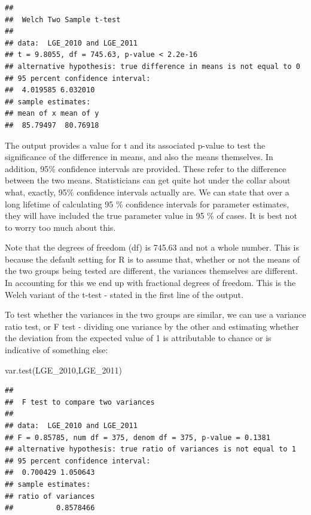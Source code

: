 \documentclass[
]{book}
\newenvironment{Shaded}{\begin{snugshade}}{\end{snugshade}}
\newcommand{\FunctionTok}[1]{\textcolor[rgb]{0.00,0.00,0.00}{#1}}
\newcommand{\NormalTok}[1]{#1}
\begin{document}
\begin{verbatim}
## 
##  Welch Two Sample t-test
## 
## data:  LGE_2010 and LGE_2011
## t = 9.8055, df = 745.63, p-value < 2.2e-16
## alternative hypothesis: true difference in means is not equal to 0
## 95 percent confidence interval:
##  4.019585 6.032010
## sample estimates:
## mean of x mean of y 
##  85.79497  80.76918
\end{verbatim}

The output provides a value for t and its associated p-value to test the significance of the difference in means, and also the means themselves. In addition, 95\% confidence intervals are provided. These refer to the difference between the two means. Statisticians can get quite hot under the collar about what, exactly, 95\% confidence intervals actually are. We can state that over a long lifetime of calculating 95 \% confidence intervals for parameter estimates, they will have included the true parameter value in 95 \% of cases. It is best not to worry too much about this.

Note that the degrees of freedom (df) is 745.63 and not a whole number. This is because the default setting for R is to assume that, whether or not the means of the two groups being tested are different, the variances themselves are different. In accounting for this we end up with fractional degrees of freedom. This is the Welch variant of the t-test - stated in the first line of the output.

To test whether the variances in the two groups are similar, we can use a variance ratio test, or F test - dividing one variance by the other and estimating whether the deviation from the expected value of 1 is attributable to chance or is indicative of something else:

\begin{Shaded}
\begin{Highlighting}[]
\FunctionTok{var.test}\NormalTok{(LGE\_2010,LGE\_2011)}
\end{Highlighting}
\end{Shaded}

\begin{verbatim}
## 
##  F test to compare two variances
## 
## data:  LGE_2010 and LGE_2011
## F = 0.85785, num df = 375, denom df = 375, p-value = 0.1381
## alternative hypothesis: true ratio of variances is not equal to 1
## 95 percent confidence interval:
##  0.700429 1.050643
## sample estimates:
## ratio of variances 
##          0.8578466
\end{verbatim}
\end{document}
